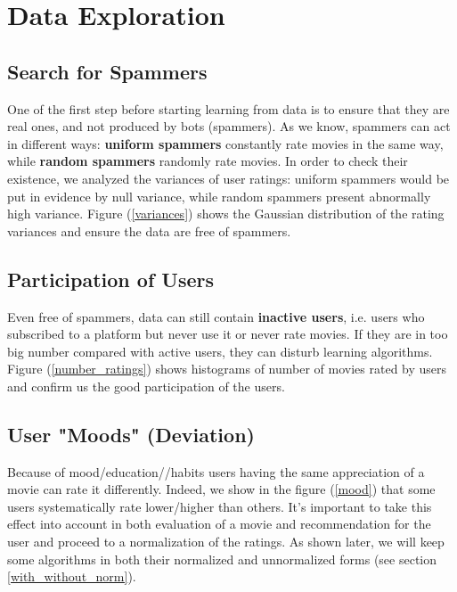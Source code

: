 \documentclass[10pt,conference,compsocconf]{IEEEtran}
\begin{document}
\section{Data Exploration}

\subsection{Search for Spammers}

One of the first step before starting learning from data is to ensure that they are real ones, and not produced by bots (spammers). As we know, spammers can act in different ways: \textbf{uniform spammers} constantly rate movies in the same way, while \textbf{random spammers} randomly rate movies. In order to check their existence, we analyzed the variances of user ratings: uniform spammers would be put in evidence by null variance, while random spammers present abnormally high variance. Figure (\ref{variances}) shows the Gaussian distribution of the rating variances and ensure the data are free of spammers.

\subsection{Participation of Users}

Even free of spammers, data can still contain \textbf{inactive users}, i.e. users who subscribed to a platform but never use it or never rate movies. If they are in too big number compared with active users, they can disturb learning algorithms. Figure (\ref{number_ratings}) shows histograms of number of movies rated by users and confirm us the good participation of the users.

\subsection{User "Moods" (Deviation)}

Because of mood/education//habits users having the same appreciation of a movie can rate it differently. Indeed, we show in the figure (\ref{mood}) that some users systematically rate lower/higher than others. It's important to take this effect into account in both evaluation of a movie and recommendation for the user and proceed to a normalization of the ratings. As shown later, we will keep some algorithms in both their normalized and unnormalized forms (see section \ref{with_without_norm}).
\end{document}
